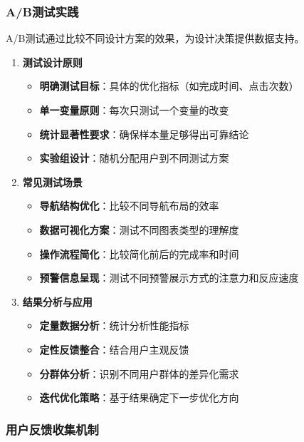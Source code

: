 \subsubsection{A/B测试实践}\label{abux6d4bux8bd5ux5b9eux8df5}

A/B测试通过比较不同设计方案的效果，为设计决策提供数据支持。

\begin{enumerate}
\def\labelenumi{\arabic{enumi}.}
\tightlist
\item
  \textbf{测试设计原则}

  \begin{itemize}
  \tightlist
  \item
    \textbf{明确测试目标}：具体的优化指标（如完成时间、点击次数）
  \item
    \textbf{单一变量原则}：每次只测试一个变量的改变
  \item
    \textbf{统计显著性要求}：确保样本量足够得出可靠结论
  \item
    \textbf{实验组设计}：随机分配用户到不同测试方案
  \end{itemize}
\item
  \textbf{常见测试场景}

  \begin{itemize}
  \tightlist
  \item
    \textbf{导航结构优化}：比较不同导航布局的效率
  \item
    \textbf{数据可视化方案}：测试不同图表类型的理解度
  \item
    \textbf{操作流程简化}：比较简化前后的完成率和时间
  \item
    \textbf{预警信息呈现}：测试不同预警展示方式的注意力和反应速度
  \end{itemize}
\item
  \textbf{结果分析与应用}

  \begin{itemize}
  \tightlist
  \item
    \textbf{定量数据分析}：统计分析性能指标
  \item
    \textbf{定性反馈整合}：结合用户主观反馈
  \item
    \textbf{分群体分析}：识别不同用户群体的差异化需求
  \item
    \textbf{迭代优化策略}：基于结果确定下一步优化方向
  \end{itemize}
\end{enumerate}

\subsubsection{用户反馈收集机制}\label{ux7528ux6237ux53cdux9988ux6536ux96c6ux673aux5236}

